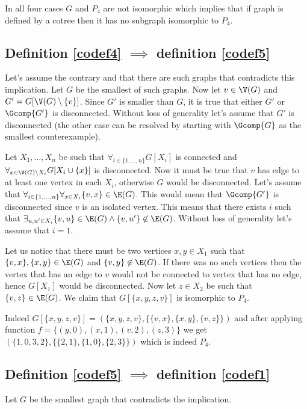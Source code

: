 In all four cases $G$ and $P_4$ are not isomorphic which implies that if graph is defined by a cotree then it has no subgraph isomorphic to $P_4$.

\subsection{Definition \ref{codef4} $\implies$ definition \ref{codef5}}

Let's assume the contrary and that there are such graphs that contradicts this implication. Let $G$ be the smallest of such graphs. Now let $v \in \V(G)$ and $G' = G[\V(G) \setminus \{v\}]$. Since $G'$ is smaller than $G$, it is true that either $G'$ or $\Gcomp{G'}$ is disconnected. Without loss of generality let's assume that $G'$ is disconnected (the other case can be resolved by starting with $\Gcomp{G}$ as the smallest counterexample).

Let $X_1, \ldots, X_n$ be such that $\forall_{i \in \{1, \ldots, n\}} G[X_i]$ is connected and $\forall_{x \in \V(G) \setminus X_i} G[X_i \cup \{x\}]$ is disconnected. Now it must be true that $v$ has edge to at least one vertex in each $X_i$, otherwise $G$ would be disconnected. Let's assume that $\forall_{i \in \{1,\ldots,n\}} \forall_{x \in X_i} \{v,x\} \in \E(G)$. This would mean that $\Gcomp{G'}$ is disconnected since $v$ is an isolated vertex. This means that there exists $i$ such that $\exists_{u, u' \in X_i} \{v, u\} \in \E(G) \land \{v, u'\} \not\in \E(G)$. Without loss of generality let's assume that $i = 1$.

Let us notice that there must be two vertices $x, y \in X_1$ such that $\{v, x\}, \{x, y\} \in \E(G)$ and $\{v,y\} \not\in \E(G)$. If there was no such vertices then the vertex that has an edge to $v$ would not be connected to vertex that has no edge, hence $G[X_1]$ would be disconnected. Now let $z \in X_2$ be such that $\{v, z\} \in \E(G)$. We claim that $G[\{x,y,z,v\}]$ is isomorphic to $P_4$.

Indeed $G[\{x,y,z,v\}] = (\{x,y,z,v\}, \{\{v,x\}, \{x, y\}, \{v,z\}\})$ and after applying function $f = \{(y, 0), (x, 1), (v, 2), (z, 3)\}$ we get $(\{1,0,3,2\}, \{\{2,1\}, \{1, 0\}, \{2,3\}\})$ which is indeed $P_4$.

\subsection{Definition \ref{codef5} $\implies$ definition \ref{codef1}}

Let $G$ be the smallest graph that contradicts the implication.

